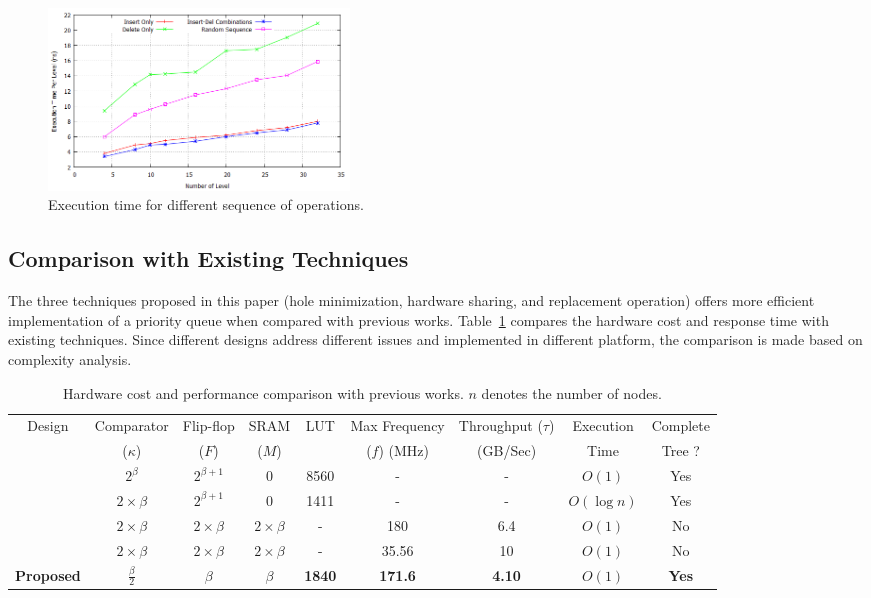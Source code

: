\documentclass[10pt, conference, compsocconf]{IEEEtran}
\begin{document}
\begin{figure}[!ht]
  \centering
  \includegraphics[width=8.0cm]{Figures/random.png}
      \caption{Execution time for different sequence of operations.}
    \label{random}
\end{figure}

\subsection{Comparison with Existing Techniques}

The three techniques proposed in this paper (hole minimization, hardware sharing, and replacement operation) offers more efficient implementation of a priority queue when compared with previous works.
Table~\ref{table4} compares the hardware cost and response time with existing techniques.
Since different designs address different issues and implemented in different platform, the comparison is made based on complexity analysis.

\begin{table}
 \begin{center}
 \caption{Hardware cost and performance comparison with previous works. $n$ denotes the number of nodes.}
\label{table4}
\begin{tabular}{ |c|c|c|c|c|c|c|c|c| }
 \hline
 Design  & Comparator  & Flip-flop & SRAM & LUT &Max Frequency & Throughput ($\tau$) & Execution & Complete \\
  & ($\kappa$)& ($F$)& ($M$) &  & ($f$) (MHz) & (GB/Sec) & Time & Tree ?\\
 \hline
 \hline
 \cite{hw8} & $2^\beta$ & $2^{\beta +1}$& 0 & 8560 & - & - & $O(1)$ & Yes\\
 \hline
 \cite{hw11} & $2 \times \beta$ & $2^{\beta +1}$ & 0 & 1411 & - & - & $O(\log n)$ & Yes\\
 \hline
 \cite{fpga1} & $2 \times \beta$ & $2 \times \beta$ & $2 \times \beta$ & - & 180 &6.4 & $O(1)$ & No\\
 \hline
 \cite{hw2} & $2 \times \beta$ & $2 \times \beta$ & $2 \times \beta$ & - & 35.56 &10 & $O(1)$ & No\\
 \hline
{\bf Proposed} & {\bf $\frac{\beta}{2}$} & {\bf $\beta$} & {\bf $\beta$} & {\bf 1840} & {\bf 171.6} & {\bf 4.10} & {\bf $O(1)$} & {\bf Yes}\\
 \hline
\end{tabular}
\end{center}
\end{table}
\end{document}
